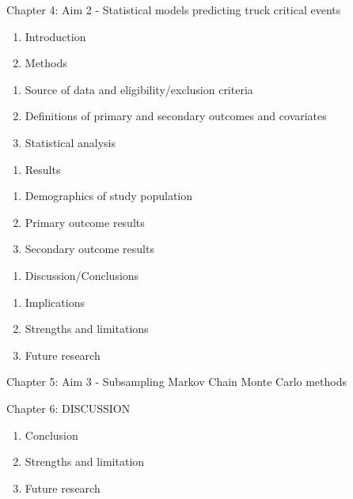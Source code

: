 \documentclass[12pt]{book}
\numberwithin{equation}{chapter}
\providecommand{\tightlist}{%
  \setlength{\itemsep}{0pt}\setlength{\parskip}{0pt}}
\begin{document}
Chapter 4: Aim 2 - Statistical models predicting truck critical events

\begin{enumerate}
\def\labelenumi{\Alph{enumi}.}
\tightlist
\item
  Introduction
\item
  Methods
\end{enumerate}

\begin{enumerate}
\def\labelenumi{\arabic{enumi}.}
\tightlist
\item
  Source of data and eligibility/exclusion criteria
\item
  Definitions of primary and secondary outcomes and covariates
\item
  Statistical analysis
\end{enumerate}

\begin{enumerate}
\def\labelenumi{\Alph{enumi}.}
\setcounter{enumi}{2}
\tightlist
\item
  Results
\end{enumerate}

\begin{enumerate}
\def\labelenumi{\arabic{enumi}.}
\tightlist
\item
  Demographics of study population
\item
  Primary outcome results
\item
  Secondary outcome results
\end{enumerate}

\begin{enumerate}
\def\labelenumi{\Alph{enumi}.}
\setcounter{enumi}{3}
\tightlist
\item
  Discussion/Conclusions
\end{enumerate}

\begin{enumerate}
\def\labelenumi{\arabic{enumi}.}
\tightlist
\item
  Implications
\item
  Strengths and limitations
\item
  Future research
\end{enumerate}

Chapter 5: Aim 3 - Subsampling Markov Chain Monte Carlo methods

Chapter 6: DISCUSSION

\begin{enumerate}
\def\labelenumi{\Alph{enumi}.}
\tightlist
\item
  Conclusion
\item
  Strengths and limitation
\item
  Future research
\end{enumerate}
\end{document}
